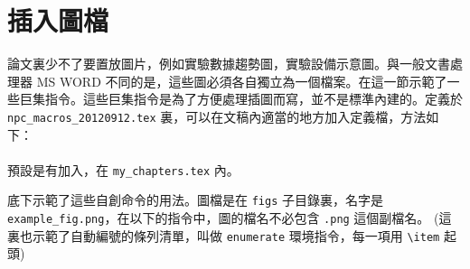 \section{插入圖檔}
\label{sec:fig}

論文裏少不了要置放圖片，例如實驗數據趨勢圖，實驗設備示意圖。與一般文書處理器 MS WORD 不同的是，這些圖必須各自獨立為一個檔案。在這一節示範了一些巨集指令。這些巨集指令是為了方便處理插圖而寫，並不是標準內建的。定義於 \verb+npc_macros_20120912.tex+ 裏，可以在文稿內適當的地方加入定義檔，方法如下：\\
\verb++\\
預設是有加入，在  \verb+my_chapters.tex+ 內。

底下示範了這些自創命令的用法。圖檔是在 \texttt{figs} 子目錄裏，名字是 \verb+example_fig.png+，在以下的指令中，圖的檔名不必包含 \verb+.png+ 這個副檔名。 (這裏也示範了自動編號的條列清單，叫做 \texttt{enumerate} 環境指令，每一項用 \verb+\item+ 起頭)


